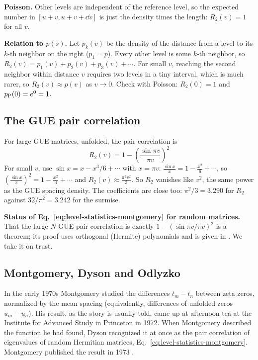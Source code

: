 \textbf{Poisson.} Other levels are independent of the reference level, so the expected number in $[u+v,u+v+\dd v]$ is just the density times the length: $R_2(v)=1$ for all $v$.

\textbf{Relation to $p(s)$.} Let $p_k(v)$ be the density of the distance from a level to its $k$-th neighbor on the right ($p_1=p$). Every other level is some $k$-th neighbor, so $R_2(v)=p_1(v)+p_2(v)+p_3(v)+\cdots$. For small $v$, reaching the second neighbor within distance $v$ requires two levels in a tiny interval, which is much rarer, so $R_2(v)\approx p(v)$ as $v\to0$. Check with Poisson: $R_2(0)=1$ and $p_{\rm P}(0)=e^0=1$.

\subsection{The GUE pair correlation}

For large GUE matrices, unfolded, the pair correlation is
\begin{equation}
\boxed{\;R_2(v)=1-\left(\frac{\sin\pi v}{\pi v}\right)^2\;}
\label{eq:level-statistics-montgomery}
\end{equation}
For small $v$, use $\sin x=x-x^3/6+\cdots$ with $x=\pi v$: $\frac{\sin x}{x}=1-\frac{x^2}{6}+\cdots$, so $\left(\frac{\sin x}{x}\right)^2=1-\frac{x^2}{3}+\cdots$ and $R_2(v)\approx\frac{\pi^2v^2}{3}$. So $R_2$ vanishes like $v^2$, the same power as the GUE spacing density. The coefficients are close too: $\pi^2/3=3.290$ for $R_2$ against $32/\pi^2=3.242$ for the surmise.

\begin{beyond}
\textbf{Status of Eq.~\eqref{eq:level-statistics-montgomery} for random matrices.} That the large-$N$ GUE pair correlation is exactly $1-(\sin\pi v/\pi v)^2$ is a theorem; its proof uses orthogonal (Hermite) polynomials and is given in \cite{mehta}. We take it on trust.
\end{beyond}

\subsection{Montgomery, Dyson and Odlyzko}

In the early 1970s Montgomery studied the differences $t_m-t_n$ between zeta zeros, normalized by the mean spacing (equivalently, differences of unfolded zeros $u_m-u_n$). His result, as the story is usually told, came up at afternoon tea at the Institute for Advanced Study in Princeton in 1972. When Montgomery described the function he had found, Dyson recognized it at once as the pair correlation of eigenvalues of random Hermitian matrices, Eq.~\eqref{eq:level-statistics-montgomery}. Montgomery published the result in 1973 \cite{montgomery}.

